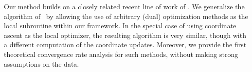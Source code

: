 \documentclass{article} %
\begin{document}
%
%

Our method builds on a closely related recent line of work of
\cite{Yang:2013vl,Yang:2013ui,Yu:2010ct,Yu:2012fp}.
We generalize the algorithm of~\cite{Yang:2013vl,Yang:2013ui} by allowing
the use of arbitrary (dual) optimization methods as the local subroutine within our framework. 
In the special case of using coordinate ascent as the local optimizer, the
resulting algorithm is very similar, though with a different computation of the
coordinate updates.
Moreover, we provide the first theoretical convergence rate analysis for such
methods, without making strong assumptions on the data. %
\end{document}
